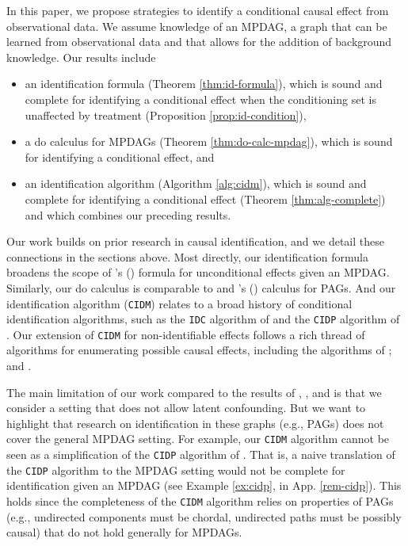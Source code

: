 \documentclass[11pt]{article}
\begin{document}
In this paper, we propose strategies to identify a conditional causal effect from observational data. We assume knowledge of an MPDAG, a graph that can be learned from observational data and that allows for the addition of background knowledge. Our results include 
\begin{itemize}
    \item an identification formula (Theorem \ref{thm:id-formula}), which is sound and complete for identifying a conditional effect when the conditioning set is unaffected by treatment (Proposition \ref{prop:id-condition}),
    
    \item a do calculus for MPDAGs (Theorem \ref{thm:do-calc-mpdag}), which is sound for identifying a conditional effect, and
    
    \item an identification algorithm (Algorithm \ref{alg:cidm}), which is sound and complete for identifying a conditional effect (Theorem \ref{thm:alg-complete}) and which combines our preceding results.
\end{itemize} 
Our work builds on prior research in causal identification, and we detail these connections in the sections above. Most directly, our identification formula broadens the scope of \citeauthor{perkovic2020identifying}'s (\citeyear{perkovic2020identifying}) formula for unconditional effects given an MPDAG. Similarly, our do calculus is comparable to \cite{zhang2008causal} and \citeauthor{jaber2022causal}'s (\citeyear{jaber2022causal}) calculus for PAGs. And our identification algorithm (\texttt{CIDM}) relates to a broad history of conditional identification algorithms, such as the \texttt{IDC} algorithm of \cite{shpitser2006identification} and the \texttt{CIDP} algorithm of \cite{jaber2022causal}. Our extension of \texttt{CIDM} for non-identifiable effects follows a rich thread of algorithms for enumerating possible causal effects, including the algorithms of \cite{maathuis2009estimating, maathuis2010predicting, nandy2017estimating, fang2020ida}; and \cite{guo2021minimal}.


The main limitation of our work compared to the results of \cite{shpitser2006identification}, \cite{zhang2008causal}, and \cite{jaber2022causal} is that we consider a setting that does not allow latent confounding. But we want to highlight that research on identification in these graphs (e.g., PAGs) does not cover the general MPDAG setting. For example, our \texttt{CIDM} algorithm cannot be seen as a simplification of the \texttt{CIDP} algorithm of \cite{jaber2022causal}. That is, a naive translation of the \texttt{CIDP} algorithm to the MPDAG setting would not be complete for identification given an MPDAG (see Example \ref{ex:cidp}, in App. \ref{rem-cidp}). This holds since the completeness of the \texttt{CIDM} algorithm relies on properties of PAGs (e.g., undirected components must be chordal, undirected paths must be possibly causal) that do not hold generally for MPDAGs.
\end{document}
